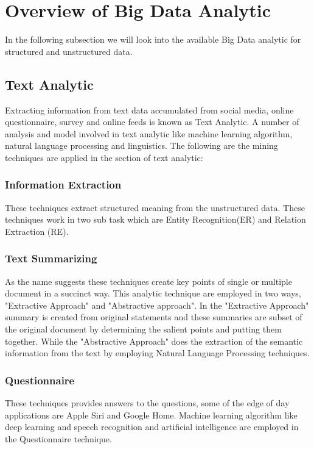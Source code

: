 \documentclass[sigconf]{acmart}
\begin{document}
 \section{Overview of Big Data Analytic}
 In the following subsection we will look into the available Big Data analytic for structured and unstructured data.
 
 \subsection{Text Analytic}
 
 Extracting information from text data accumulated from social media, online questionnaire, survey and online feeds is known as Text Analytic. A number of analysis and model involved in text analytic like machine learning algorithm, natural language processing and linguistics. The following are the mining techniques are applied in the section of text analytic:
 
 
\subsubsection{Information Extraction}

These techniques extract structured meaning from the unstructured data. These techniques work in two sub task which are Entity Recognition(ER)\cite{bigdata} and Relation Extraction (RE)\cite{bigdata}.

\subsubsection{Text Summarizing}

As the name suggests these techniques create key points of single or multiple document in a succinct way. This analytic technique are employed in two ways, "Extractive Approach"\cite{bigdata} and "Abstractive approach"\cite{bigdata}. In the "Extractive Approach" summary is created from original statements and these summaries are subset of the original document by determining the salient points and putting them together. While the "Abstractive Approach" does the extraction of the semantic information from the text by employing Natural Language Processing techniques.

\subsubsection{Questionnaire}

These techniques provides answers to the questions, some of the edge of day applications are Apple Siri and Google Home\cite{bigdata}. Machine learning algorithm like deep learning and speech recognition and artificial intelligence are employed in the Questionnaire technique.
\end{document}
